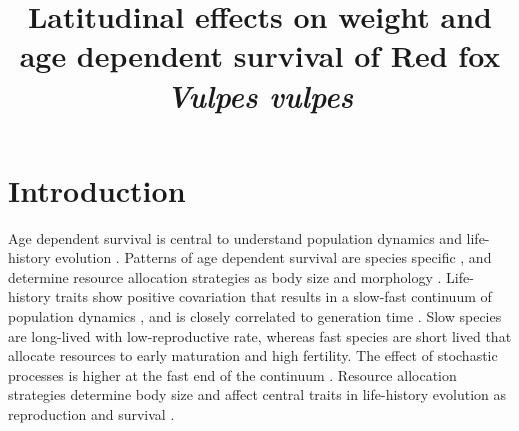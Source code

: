 \documentclass[PCJ,Unicode,screen]{cedram}
\title[Sample for the template]{Latitudinal effects on weight and age dependent survival of Red fox \emph{Vulpes vulpes}}
\author{\firstname{Tomas} \lastname{Willebrand}}
\author{\firstname{Morten} \lastname{Odden}}
\author{\firstname{Gustaf} \lastname{Samelius}}
\author{\firstname{Kjartat} \lastname{Østbye}}
\author{\firstname{Jan} \lastname{Englund}}
\begin{document}
\maketitle
\onehalfspacing


\section*{Introduction}

Age dependent survival is central to understand population dynamics and life-history evolution \citep{stearnsLifeHistoryEvolution2000,lande2003stochastic,stearnsLifeHistoryEvolution2000}. Patterns of age dependent survival are species specific  \citep{martinPatternsMechanismsAgeDependent1995,loisonAGESPECIFICSURVIVALFIVE}, and determine resource allocation strategies as body size and morphology \citep{roffPredictingBodySize1986,siblyEffectsBodySize2007,brooksHowWellCan2016}. Life-history traits show positive covariation that results in a slow-fast continuum of population dynamics \citep{oliFastSlowContinuum2004}, and is closely correlated to generation time \citep{krausLivingSlowDying2005}. Slow species are long-lived with low-reproductive rate, whereas fast species are short lived that allocate resources to early maturation and high fertility. The effect of stochastic processes is higher at the fast end of the continuum \citep{saetherHowLifeHistory2013}. Resource allocation strategies determine body size and affect central traits  in life-history evolution as reproduction and survival \citep{roffPredictingBodySize1986,siblyEffectsBodySize2007,brooksHowWellCan2016}.
\end{document}
